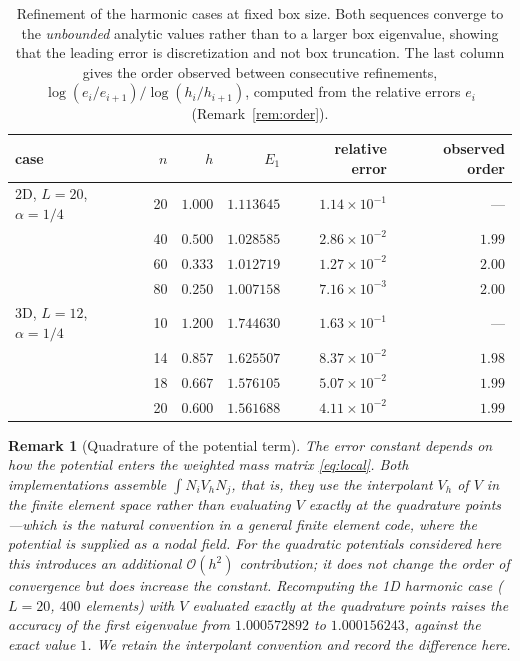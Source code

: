 \documentclass[pdflatex,sn-mathphys-num]{sn-jnl}
\theoremstyle{thmstyleone}%
\theoremstyle{thmstyletwo}%
\newtheorem{remark}{Remark}%
\theoremstyle{thmstylethree}%
\begin{document}
\begin{table}[t]
\caption{Refinement of the harmonic cases at fixed box size. Both sequences
converge to the \emph{unbounded} analytic values rather than to a larger box
eigenvalue, showing that the leading error is discretization and not box
truncation. The last column gives the order observed between consecutive
refinements, $\log(e_i/e_{i+1})/\log(h_i/h_{i+1})$, computed from the relative
errors $e_i$ (Remark~\ref{rem:order}).}\label{tab:harm-conv}
\begin{tabular}{@{}lrrrrr@{}}
\toprule
case & $n$ & $h$ & $E_1$ & relative error & observed order \\
\midrule
2D, $L=20$, $\alpha=1/4$ & 20 & $1.000$ & $1.113645$ & $1.14\times10^{-1}$ & --- \\
                         & 40 & $0.500$ & $1.028585$ & $2.86\times10^{-2}$ & $1.99$ \\
                         & 60 & $0.333$ & $1.012719$ & $1.27\times10^{-2}$ & $2.00$ \\
                         & 80 & $0.250$ & $1.007158$ & $7.16\times10^{-3}$ & $2.00$ \\
\midrule
3D, $L=12$, $\alpha=1/4$ & 10 & $1.200$ & $1.744630$ & $1.63\times10^{-1}$ & --- \\
                         & 14 & $0.857$ & $1.625507$ & $8.37\times10^{-2}$ & $1.98$ \\
                         & 18 & $0.667$ & $1.576105$ & $5.07\times10^{-2}$ & $1.99$ \\
                         & 20 & $0.600$ & $1.561688$ & $4.11\times10^{-2}$ & $1.99$ \\
\bottomrule
\end{tabular}
\end{table}

\begin{remark}[Quadrature of the potential term]\label{rem:quadrature}
The error constant depends on how the potential enters the weighted mass matrix
\eqref{eq:local}. Both implementations assemble $\int N_i V_h N_j$, that is, they
use the \emph{interpolant} $V_h$ of $V$ in the finite element space rather than
evaluating $V$ exactly at the quadrature points---which is the natural convention
in a general finite element code, where the potential is supplied as a nodal
field. For the quadratic potentials considered here this introduces an additional
$\mathcal{O}(h^2)$ contribution; it does not change the order of convergence but
does increase the constant. Recomputing the 1D harmonic case ($L = 20$, $400$
elements) with $V$ evaluated exactly at the quadrature points raises the accuracy
of the first eigenvalue from $1.000572892$ to $1.000156243$, against the exact
value $1$. We retain the interpolant convention and record the difference here.
\end{remark}
\end{document}
